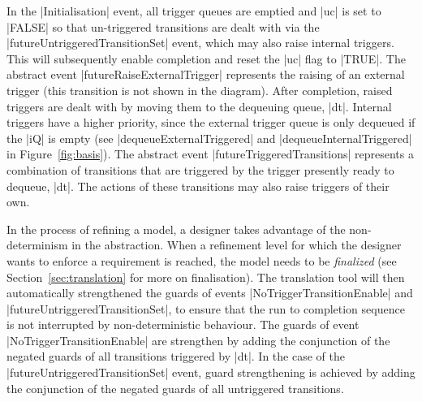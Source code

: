 In the |Initialisation| event, all trigger queues are emptied 
and |uc| is set to |FALSE| so that un-triggered transitions are dealt with via the
|futureUntriggeredTransitionSet| event, which may also raise internal triggers.
This will subsequently enable completion and reset the |uc| flag to |TRUE|.
The abstract event |futureRaiseExternalTrigger| represents the raising 
of an external trigger (this transition is not shown in the diagram).    
After completion, raised triggers are dealt with by moving them to the dequeuing queue, |dt|.
Internal triggers have a higher priority, since the external trigger queue is only dequeued if 
the |iQ| is empty (see |dequeueExternalTriggered| and |dequeueInternalTriggered| in Figure~\ref{fig:basis}).
The abstract event |futureTriggeredTransitions| represents a combination 
of transitions that are triggered by the trigger presently ready to dequeue, |dt|.
The actions of these transitions may also raise triggers of their own.


In the process of refining a model, a designer takes advantage of the non-determinism 
in the abstraction. When a refinement level for which the designer wants to enforce 
a requirement is reached, the model needs to be \emph{finalized} (see Section~\ref{sec:translation} for more on finalisation). The \SCXML translation tool
will then automatically strengthened the guards of events 
|NoTriggerTransitionEnable| and |futureUntriggeredTransitionSet|, 
to ensure that the run to completion sequence is not interrupted by non-deterministic behaviour. 
The guards of event |NoTriggerTransitionEnable| are strengthen by 
adding the conjunction of the negated guards of all transitions triggered by |dt|.
In the case of the |futureUntriggeredTransitionSet| event, guard strengthening is 
achieved by adding the conjunction of the negated guards of all untriggered transitions.




